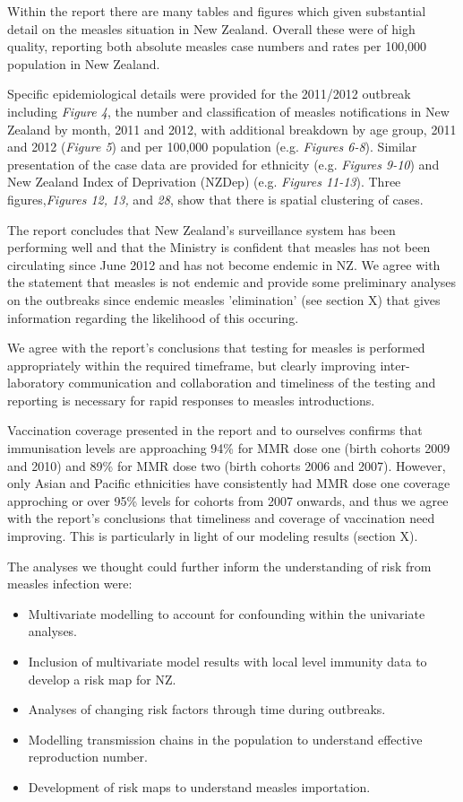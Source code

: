 \documentclass{article}
\begin{document}
Within the report there are many tables and figures which given substantial detail on the measles situation in New Zealand. Overall these were of high quality, reporting both absolute measles case numbers and rates per 100,000 population in New Zealand.

Specific epidemiological details were provided for the 2011/2012 outbreak including \emph{Figure 4}, the number and classification of measles notifications in New Zealand by month, 2011 and 2012, with additional breakdown by age group, 2011 and 2012 (\emph{Figure 5}) and per 100,000 population (e.g. \emph{Figures 6-8}). Similar presentation of the case data are provided for ethnicity (e.g. \emph{Figures 9-10}) and New Zealand Index of Deprivation (NZDep) (e.g. \emph{Figures 11-13}). Three figures,\emph{Figures 12, 13,} and \emph{28}, show that there is spatial clustering of cases.

The report concludes that New Zealand's surveillance system has been performing well and that the Ministry is confident that measles has not been circulating since June 2012 and has not become endemic in NZ. We agree with the statement that measles is not endemic and provide some preliminary analyses on the outbreaks since endemic measles 'elimination' (see section X) that gives information regarding the likelihood of this occuring.

We agree with the report's conclusions that testing for measles is performed appropriately within the required timeframe, but clearly improving inter-laboratory communication and collaboration and timeliness of the testing and reporting is necessary for rapid responses to measles introductions.

Vaccination coverage presented in the report and to ourselves confirms that immunisation levels are approaching 94\% for MMR dose one (birth cohorts 2009 and 2010) and 89\% for MMR dose two (birth cohorts 2006 and 2007). However, only Asian and Pacific ethnicities have consistently had MMR dose one coverage approching or over 95\% levels for cohorts from 2007 onwards, and thus we agree with the report's conclusions that timeliness and coverage of vaccination need improving. This is particularly in light of our modeling results (section X).

The analyses we thought could further inform the understanding of risk from measles infection were:
\begin{itemize}
\item Multivariate modelling to account for confounding within the univariate analyses.
\item Inclusion of multivariate model results with local level immunity data to develop a risk map for NZ. 
\item Analyses of changing risk factors through time during outbreaks.
\item Modelling transmission chains in the population to understand effective reproduction number.
\item Development of risk maps to understand measles importation.
\end{itemize}
\end{document}
